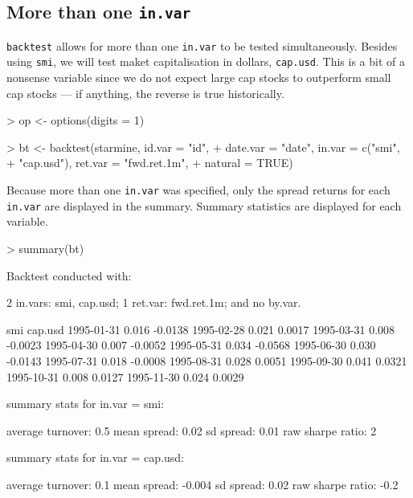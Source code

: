 \documentclass[a4paper]{report}
\begin{document}
\begin{article}
\section*{More than one \texttt{in.var}}

\texttt{backtest} allows for more than one \texttt{in.var} to be
tested simultaneously. Besides using \texttt{smi}, we will test maket
capitalisation in dollars, \texttt{cap.usd}. This is a bit of a
nonsense variable since we do not expect large cap stocks to
outperform small cap stocks --- if anything, the reverse is true
historically.

\begin{Schunk}
\begin{Sinput}
> op <- options(digits = 1)
\end{Sinput}
\end{Schunk}

\begin{Schunk}
\begin{Sinput}
> bt <- backtest(starmine, id.var = "id", 
+     date.var = "date", in.var = c("smi", 
+         "cap.usd"), ret.var = "fwd.ret.1m", 
+     natural = TRUE)
\end{Sinput}
\end{Schunk}


Because more than one \texttt{in.var} was specified, only the spread
returns for each \texttt{in.var} are displayed in the summary.
Summary statistics are displayed for each variable.

\begin{Schunk}
\begin{Sinput}
> summary(bt)
\end{Sinput}
\begin{Soutput}
Backtest conducted with:

2 in.vars: smi, cap.usd;
1 ret.var: fwd.ret.1m;
and no by.var.

             smi cap.usd
1995-01-31 0.016 -0.0138
1995-02-28 0.021  0.0017
1995-03-31 0.008 -0.0023
1995-04-30 0.007 -0.0052
1995-05-31 0.034 -0.0568
1995-06-30 0.030 -0.0143
1995-07-31 0.018 -0.0008
1995-08-31 0.028  0.0051
1995-09-30 0.041  0.0321
1995-10-31 0.008  0.0127
1995-11-30 0.024  0.0029

summary stats for in.var = smi:

average turnover: 0.5
mean spread: 0.02
sd spread: 0.01
raw sharpe ratio: 2

summary stats for in.var = cap.usd:

average turnover: 0.1
mean spread: -0.004
sd spread: 0.02
raw sharpe ratio: -0.2
\end{Soutput}
\end{Schunk}


\end{article}
\end{document}
